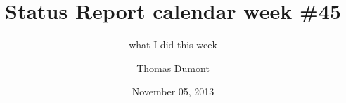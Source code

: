 \documentclass[compress]{beamer}
\title[Status Report cw \#45]{%
  Status Report calendar week \#45
}
\subtitle{%
  what I did this week
}
\institute{%
  My Lab, AMU\\
  \medskip\emph{my@mail.fr}
}
\author{Thomas Dumont}
\date{November 05, 2013}
\begin{document}
\begin{frame}[plain]
\titlepage
\end{frame}


\end{document}

